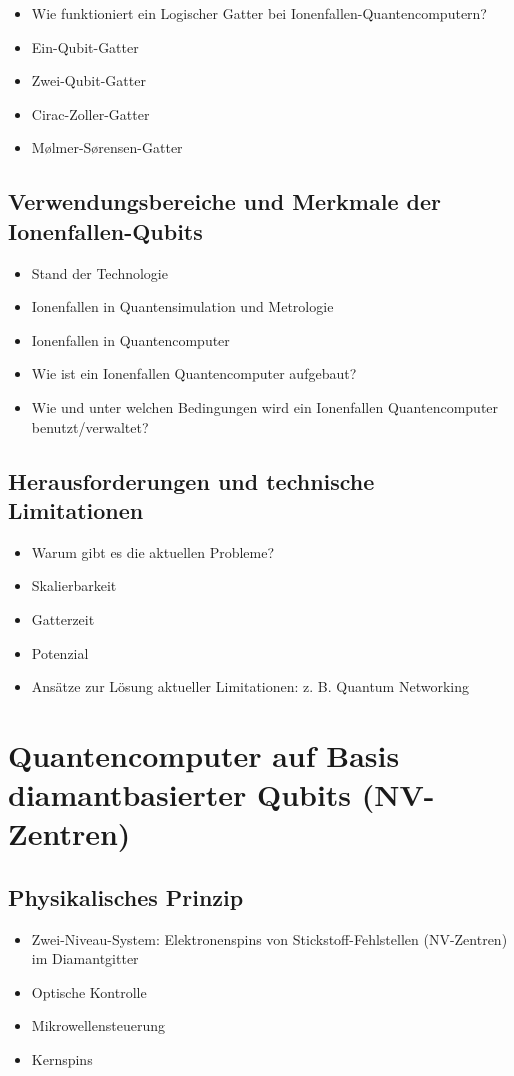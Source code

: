     \begin{itemize}
        \item Wie funktioniert ein Logischer Gatter bei Ionenfallen-Quantencomputern?
        \item Ein-Qubit-Gatter
        \item Zwei-Qubit-Gatter
        \item Cirac-Zoller-Gatter
        \item Mølmer-Sørensen-Gatter
    \end{itemize}
\subsection{Verwendungsbereiche und Merkmale der Ionenfallen-Qubits}
    \begin{itemize}
        \item Stand der Technologie
        \item Ionenfallen in Quantensimulation und Metrologie
        \item Ionenfallen in Quantencomputer
        \item Wie ist ein Ionenfallen Quantencomputer aufgebaut?
        \item Wie und unter welchen Bedingungen wird ein Ionenfallen Quantencomputer benutzt/verwaltet?
    \end{itemize}
\subsection{Herausforderungen und technische Limitationen}
    \begin{itemize}
        \item Warum gibt es die aktuellen Probleme?
        \item Skalierbarkeit
        \item Gatterzeit
        \item Potenzial
        \item Ansätze zur Lösung aktueller Limitationen: z. B. Quantum Networking
    \end{itemize}

\section{Quantencomputer auf Basis diamantbasierter Qubits (NV-Zentren)}
\subsection{Physikalisches Prinzip}
    \begin{itemize}
        \item Zwei-Niveau-System: Elektronenspins von Stickstoff-Fehlstellen (NV-Zentren) im Diamantgitter
        \item Optische Kontrolle
        \item Mikrowellensteuerung
        \item Kernspins
    \end{itemize}
